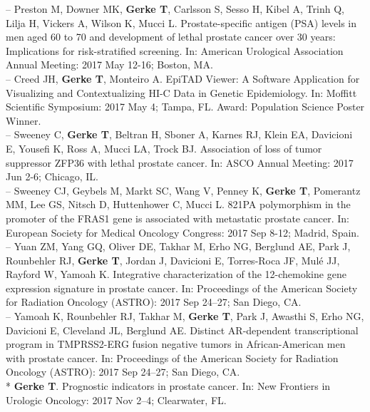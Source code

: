 \documentclass[11pt, a4paper]{article} %
\begin{document}
-- Preston M, Downer MK, {\bf Gerke T}, Carlsson S, Sesso H, Kibel A, Trinh Q, Lilja H, Vickers A, Wilson K, Mucci L. Prostate-specific antigen (PSA) levels in men aged 60 to 70 and development of lethal prostate cancer over 30 years: Implications for risk-stratified screening. In: American Urological Association Annual Meeting: 2017 May 12-16; Boston, MA.\\

-- Creed JH, {\bf Gerke T}, Monteiro A. EpiTAD Viewer: A Software Application for Visualizing and Contextualizing HI-C Data in Genetic Epidemiology. In: Moffitt Scientific Symposium: 2017 May 4; Tampa, FL. Award: Population Science Poster Winner.\\

-- Sweeney C, {\bf Gerke T}, Beltran H, Sboner A, Karnes RJ, Klein EA, Davicioni E, Yousefi K, Ross A, Mucci LA, Trock BJ. Association of loss of tumor suppressor ZFP36 with lethal prostate cancer. In: ASCO Annual Meeting: 2017 Jun 2-6; Chicago, IL.\\

-- Sweeney CJ, Geybels M, Markt SC, Wang V, Penney K, {\bf Gerke T}, Pomerantz MM, Lee GS, Nitsch D, Huttenhower C, Mucci L. 821PA polymorphism in the promoter of the FRAS1 gene is associated with metastatic prostate cancer. In: European Society for Medical Oncology Congress: 2017 Sep 8-12; Madrid, Spain.\\

-- Yuan ZM, Yang GQ, Oliver DE, Takhar M, Erho NG, Berglund AE, Park J, Rounbehler RJ, {\bf Gerke T}, Jordan J, Davicioni E, Torres-Roca JF, Mul\'{e} JJ, Rayford W, Yamoah K. Integrative characterization of the 12-chemokine gene expression signature in prostate cancer. In: Proceedings of the American Society for Radiation Oncology (ASTRO): 2017 Sep 24--27; San Diego, CA.\\

-- Yamoah K, Rounbehler RJ, Takhar M, {\bf Gerke T}, Park J, Awasthi S, Erho NG, Davicioni E, Cleveland JL, Berglund AE. Distinct AR-dependent transcriptional program in TMPRSS2-ERG fusion negative tumors in African-American men with prostate cancer. In: Proceedings of the American Society for Radiation Oncology (ASTRO): 2017 Sep 24--27; San Diego, CA.\\

* {\bf Gerke T}. Prognostic indicators in prostate cancer. In: New Frontiers in Urologic Oncology: 2017 Nov 2--4; Clearwater, FL.\\
\end{document}
